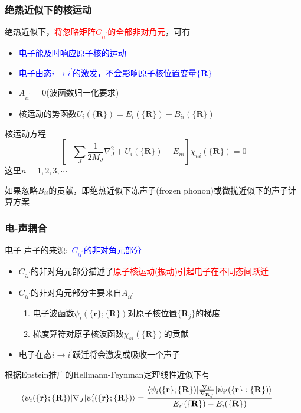 \frame
{
	\frametitle{绝热近似下的核运动}
	绝热近似下，\textcolor{red}{将忽略矩阵$C_{ii^{\prime}}$的全部非对角元}，可有
	\begin{itemize}
		\item \textcolor{blue}{电子能及时响应原子核的运动}
		\item \textcolor{blue}{电子由态$i\rightarrow i^{\prime}$的激发，不会影响原子核位置变量${\{\mathbf{R}\}}$}
		\item $A_{ii^{\prime}}=0$(波函数归一化要求)
		\item 核运动的势函数$U_i(\{\mathbf{R}\})=E_i(\{\mathbf{R}\})+B_{ii}(\{\mathbf{R}\})$
	\end{itemize}
	核运动方程
	\begin{displaymath}
		\left[ -\sum_J\frac1{2M_J}\nabla_J^2+U_i(\{\mathbf{R}\})-E_{ni} \right]\chi_{ni}(\{\mathbf{R}\})=0
	\end{displaymath}
这里$n=1,2,3,\cdots$

如果忽略$B_{ii}$的贡献，即绝热近似下冻声子(\textrm{frozen phonon})或微扰近似下的声子计算方案
}

\frame
{
	\frametitle{电-声耦合}
	电子-声子的来源:~\textcolor{blue}{$C_{ii^{\prime}}$的非对角元部分}
	\begin{itemize}
		\item $C_{ii^{\prime}}$的非对角元部分描述了\textcolor{red}{原子核运动(振动)引起电子在不同态间跃迁}
		\item $C_{ii^{\prime}}$的非对角元部分主要来自$A_{ii^{\prime}}$
			\begin{enumerate}
\setlength{\itemsep}{7pt}
				\item 电子波函数$\psi_i(\{\mathbf{r}\};\{\mathbf{R}\})$对原子核位置$\{\mathbf{R}_j\}$的梯度
				\item 梯度算符对原子核波函数$\chi_{si}(\{\mathbf{R}\})$的贡献
			\end{enumerate}
		\item 电子在态$i\rightarrow i^{\prime}$跃迁将会激发或吸收一个声子
	\end{itemize}
	根据\textrm{Epstein}推广的\textrm{Hellmann-Feynman}定理线性近似下有
	\begin{displaymath}
		\hspace*{-15pt}
		\langle\psi_i(\{\mathbf{r}\};\{\mathbf{R}\})|\nabla_J|\psi_i^{\prime}(\{\mathbf{r}\};\{\mathbf{R}\})\rangle=\frac{\langle\psi_i(\{\mathbf{r}\};\{\mathbf{R}\})|\tfrac{\nabla_V}{\nabla_{\mathbf{R}_J}}|\psi_{i^{\prime}}(\{\mathbf{r}\}:\{\mathbf{R}\})\rangle}{E_{i^{\prime}}(\{\mathbf{R}\})-E_i(\{\mathbf{R}\})}
	\end{displaymath}
}

